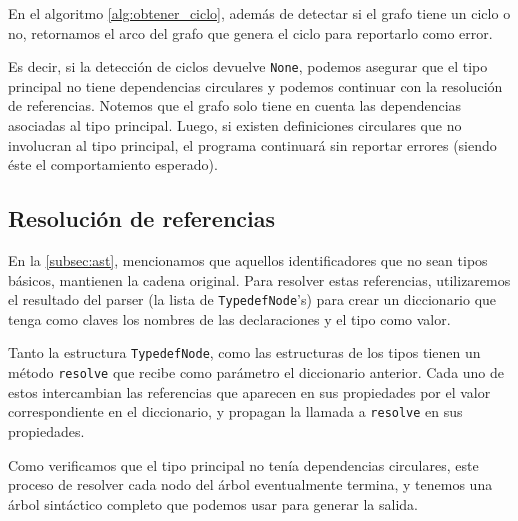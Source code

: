     En el algoritmo \ref{alg:obtener_ciclo}, además de detectar si el grafo tiene un ciclo o no, retornamos el arco del grafo que genera el ciclo para reportarlo como error.

    Es decir, si la detección de ciclos devuelve \texttt{None}, podemos asegurar que el tipo principal no tiene dependencias circulares y podemos continuar con la resolución de referencias. Notemos que el grafo solo tiene en cuenta las dependencias asociadas al tipo principal. Luego, si existen definiciones circulares que no involucran al tipo principal, el programa continuará sin reportar errores (siendo éste el comportamiento esperado). 

\subsection{Resolución de referencias}

    En la \autoref{subsec:ast}, mencionamos que aquellos identificadores que no sean tipos básicos, mantienen la cadena original. Para resolver estas referencias, utilizaremos el resultado del parser (la lista de \texttt{TypedefNode}'s) para crear un diccionario que tenga como claves los nombres de las declaraciones y el tipo como valor.

    Tanto la estructura \texttt{TypedefNode}, como las estructuras de los tipos tienen un método \texttt{resolve} que recibe como parámetro el diccionario anterior. Cada uno de estos intercambian las referencias que aparecen en sus propiedades por el valor correspondiente en el diccionario, y propagan la llamada a \texttt{resolve} en sus propiedades.

    Como verificamos que el tipo principal no tenía dependencias circulares, este proceso de resolver cada nodo del árbol eventualmente termina, y tenemos una árbol sintáctico completo que podemos usar para generar la salida.
